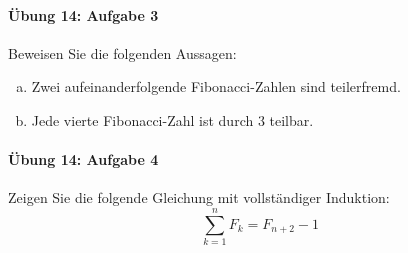\documentclass
[
  draft    = true,
  fontsize = 11pt,
  parskip  = half-,
  BCOR     = 0pt,
  DIV      = 11,
  ngerman,
  dvipsnames
]
{scrartcl}
\begin{document}
\paragraph{Übung 14: Aufgabe 3}
Beweisen Sie die folgenden Aussagen:
\begin{enumerate}[a)]
  \item Zwei aufeinanderfolgende Fibonacci-Zahlen sind teilerfremd.
  \item Jede vierte Fibonacci-Zahl ist durch 3 teilbar.
\end{enumerate}

\paragraph{Übung 14: Aufgabe 4}
Zeigen Sie die folgende Gleichung mit vollständiger Induktion:
\begin{equation*}
  \sum_{k=1}^nF_k=F_{n+2}-1
\end{equation*}


\end{document}
